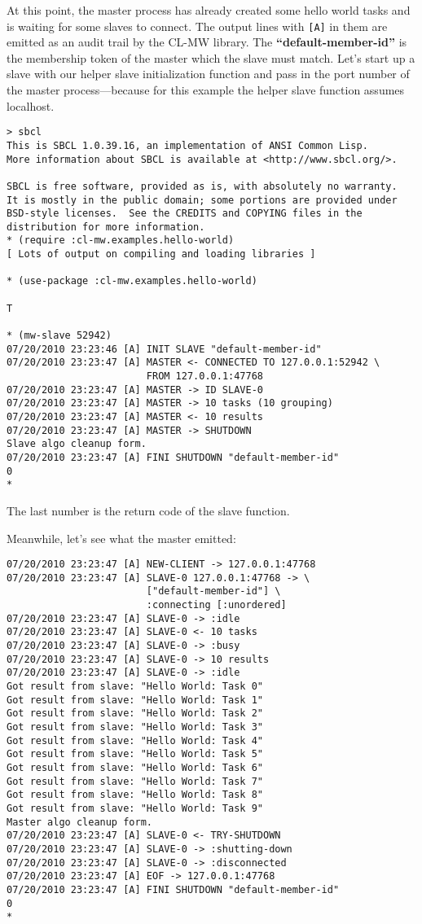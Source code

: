 \documentclass[titlepage,12pt]{book}
\newcommand{\xsmall}{\latexhtml{\small}{}}
\newcommand{\xnormalsize}{\latexhtml{\normalsize}{}}
\newcommand{\clmw}{\xsmall\textsc{CL-MW}\xnormalsize\xspace}
\newcommand{\bold}[1]{\textbf{#1}\xspace}
\begin{document}
At this point, the master process has already created some hello
world tasks and is waiting for some slaves to connect. The output
lines with \texttt{[A]} in them are emitted as an audit trail by the
\clmw library.  The \bold{``default-member-id''} is the membership
token of the master which the slave must match. Let's start up a slave
with our helper slave initialization function and pass in the port
number of the master process---because for this example the helper
slave function assumes localhost.

\small
\begin{verbatim}
> sbcl
This is SBCL 1.0.39.16, an implementation of ANSI Common Lisp.
More information about SBCL is available at <http://www.sbcl.org/>.

SBCL is free software, provided as is, with absolutely no warranty.
It is mostly in the public domain; some portions are provided under
BSD-style licenses.  See the CREDITS and COPYING files in the
distribution for more information.
* (require :cl-mw.examples.hello-world)
[ Lots of output on compiling and loading libraries ]

* (use-package :cl-mw.examples.hello-world)

T

* (mw-slave 52942)
07/20/2010 23:23:46 [A] INIT SLAVE "default-member-id"
07/20/2010 23:23:47 [A] MASTER <- CONNECTED TO 127.0.0.1:52942 \
                        FROM 127.0.0.1:47768
07/20/2010 23:23:47 [A] MASTER -> ID SLAVE-0
07/20/2010 23:23:47 [A] MASTER -> 10 tasks (10 grouping)
07/20/2010 23:23:47 [A] MASTER <- 10 results
07/20/2010 23:23:47 [A] MASTER -> SHUTDOWN
Slave algo cleanup form.
07/20/2010 23:23:47 [A] FINI SHUTDOWN "default-member-id"
0
* 
\end{verbatim}
\normalsize

The last number is the return code of the slave function.

Meanwhile, let's see what the master emitted:

\small
\begin{verbatim}
07/20/2010 23:23:47 [A] NEW-CLIENT -> 127.0.0.1:47768
07/20/2010 23:23:47 [A] SLAVE-0 127.0.0.1:47768 -> \
                        ["default-member-id"] \
                        :connecting [:unordered]
07/20/2010 23:23:47 [A] SLAVE-0 -> :idle
07/20/2010 23:23:47 [A] SLAVE-0 <- 10 tasks
07/20/2010 23:23:47 [A] SLAVE-0 -> :busy
07/20/2010 23:23:47 [A] SLAVE-0 -> 10 results
07/20/2010 23:23:47 [A] SLAVE-0 -> :idle
Got result from slave: "Hello World: Task 0"
Got result from slave: "Hello World: Task 1"
Got result from slave: "Hello World: Task 2"
Got result from slave: "Hello World: Task 3"
Got result from slave: "Hello World: Task 4"
Got result from slave: "Hello World: Task 5"
Got result from slave: "Hello World: Task 6"
Got result from slave: "Hello World: Task 7"
Got result from slave: "Hello World: Task 8"
Got result from slave: "Hello World: Task 9"
Master algo cleanup form.
07/20/2010 23:23:47 [A] SLAVE-0 <- TRY-SHUTDOWN
07/20/2010 23:23:47 [A] SLAVE-0 -> :shutting-down
07/20/2010 23:23:47 [A] SLAVE-0 -> :disconnected
07/20/2010 23:23:47 [A] EOF -> 127.0.0.1:47768
07/20/2010 23:23:47 [A] FINI SHUTDOWN "default-member-id"
0
*
\end{verbatim}
\normalsize
\end{document}
